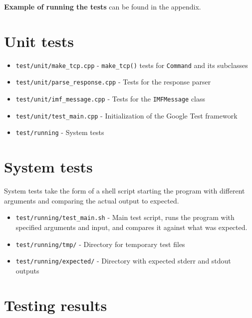 \documentclass[a4]{report}
\begin{document}
\textbf{Example of running the tests} can be found in the appendix.

\section{Unit tests}

\begin{itemize}
\item \texttt{test/unit/make\_tcp.cpp} - \texttt{make\_tcp()} tests for \texttt{Command} and its subclasses
\item \texttt{test/unit/parse\_response.cpp} - Tests for the response parser
\item \texttt{test/unit/imf\_message.cpp} - Tests for the \texttt{IMFMessage} class
\item \texttt{test/unit/test\_main.cpp} - Initialization of the Google Test framework
\item \texttt{test/running} - System tests
\end{itemize}

\section{System tests}

System tests take the form of a shell script starting the program with different arguments and comparing the actual output to expected.

\begin{itemize}
\item \texttt{test/running/test\_main.sh} - Main test script, runs the program with specified arguments and input, and compares it against what was expected.
\item \texttt{test/running/tmp/} - Directory for temporary test files
\item \texttt{test/running/expected/} - Directory with expected stderr and stdout outputs
\end{itemize}

\section{Testing results}
\end{document}
